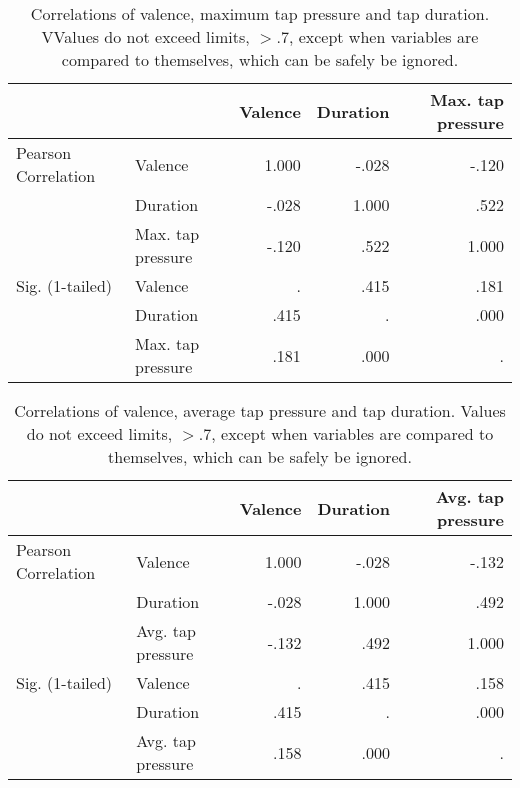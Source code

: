 \begin{table}[ht]
\centering
\begin{tabular}{@{}llrrr@{}}
                    &                   & Valence & Duration & Max. tap pressure \\ \midrule
Pearson Correlation & Valence           & 1.000   & -.028    & -.120             \\
                    & Duration          & -.028   & 1.000    & .522              \\
                    & Max. tap pressure & -.120   & .522     & 1.000             \\ \midrule
Sig. (1-tailed)     & Valence           & .       & .415     & .181              \\
                    & Duration          & .415    & .        & .000              \\
                    & Max. tap pressure & .181    & .000     & .                
\end{tabular}
\caption{Correlations of valence, maximum tap pressure and tap duration. VValues do not exceed limits, $> .7$, except when variables are compared to themselves, which can be safely be ignored.}
\label{tab:correlations_valmax}
\end{table}

\par\bigskip

\begin{table}[ht]
\centering
\begin{tabular}{@{}llrrr@{}}
                    &                   & Valence & Duration & Avg. tap pressure \\ \midrule
Pearson Correlation & Valence           & 1.000   & -.028    & -.132             \\
                    & Duration          & -.028   & 1.000    & .492              \\
                    & Avg. tap pressure & -.132   & .492     & 1.000             \\ \midrule
Sig. (1-tailed)     & Valence           & .       & .415     & .158              \\
                    & Duration          & .415    & .        & .000              \\
                    & Avg. tap pressure & .158    & .000     & .                
\end{tabular}
\caption{Correlations of valence, average tap pressure and tap duration. Values do not exceed limits, $> .7$, except when variables are compared to themselves, which can be safely be ignored.}
\label{tab:correlations_valavg}
\end{table}

